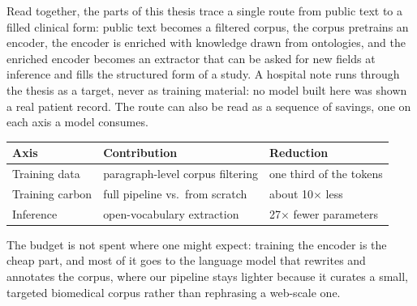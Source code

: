 

\noindent Read together, the parts of this thesis trace a single route from public text to a
filled clinical form: public text becomes a filtered corpus, the corpus pretrains
an encoder, the encoder is enriched with knowledge drawn from ontologies, and the
enriched encoder becomes an extractor that can be asked for new fields at inference
and fills the structured form of a study. A hospital note runs through the thesis
as a target, never as training material: no model built here was shown a real
patient record. The route can also be read as a sequence of savings, one on each
axis a model consumes.

\begin{center}
\begin{minipage}{\linewidth}
\centering
  \small
  \label{tab:conclusion-savings}
  \begin{tabular}{@{}lll@{}}
    \toprule
    \textbf{Axis} & \textbf{Contribution} & \textbf{Reduction} \\
    \midrule
    Training data & paragraph-level corpus filtering & one third of the tokens \\
    Training carbon & full pipeline vs.\ from scratch & about 10$\times$ less \\
    Inference & open-vocabulary extraction & 27$\times$ fewer parameters \\
    \bottomrule
  \end{tabular}
\end{minipage}
\end{center}
\medskip

The budget is not spent where one might expect: training the encoder is the cheap
part, and most of it goes to the language model that rewrites and annotates the
corpus, where our pipeline stays lighter because it curates a small, targeted
biomedical corpus rather than rephrasing a web-scale one.

